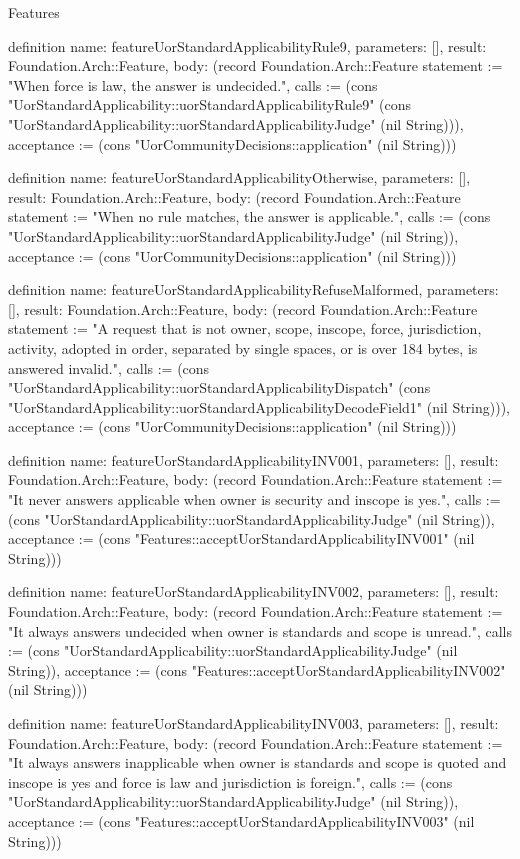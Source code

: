 \begin{lexlean}{Features}
\begin{semanticmodule}
definition{
  name: featureUorStandardApplicabilityRule9,
  parameters: [],
  result: Foundation.Arch::Feature,
  body: (record Foundation.Arch::Feature {statement := "When force is law, the answer is undecided.", calls := (cons "UorStandardApplicability::uorStandardApplicabilityRule9" (cons "UorStandardApplicability::uorStandardApplicabilityJudge" (nil String))), acceptance := (cons "UorCommunityDecisions::application" (nil String))})
}

definition{
  name: featureUorStandardApplicabilityOtherwise,
  parameters: [],
  result: Foundation.Arch::Feature,
  body: (record Foundation.Arch::Feature {statement := "When no rule matches, the answer is applicable.", calls := (cons "UorStandardApplicability::uorStandardApplicabilityJudge" (nil String)), acceptance := (cons "UorCommunityDecisions::application" (nil String))})
}

definition{
  name: featureUorStandardApplicabilityRefuseMalformed,
  parameters: [],
  result: Foundation.Arch::Feature,
  body: (record Foundation.Arch::Feature {statement := "A request that is not owner, scope, inscope, force, jurisdiction, activity, adopted in order, separated by single spaces, or is over 184 bytes, is answered invalid.", calls := (cons "UorStandardApplicability::uorStandardApplicabilityDispatch" (cons "UorStandardApplicability::uorStandardApplicabilityDecodeField1" (nil String))), acceptance := (cons "UorCommunityDecisions::application" (nil String))})
}

definition{
  name: featureUorStandardApplicabilityINV001,
  parameters: [],
  result: Foundation.Arch::Feature,
  body: (record Foundation.Arch::Feature {statement := "It never answers applicable when owner is security and inscope is yes.", calls := (cons "UorStandardApplicability::uorStandardApplicabilityJudge" (nil String)), acceptance := (cons "Features::acceptUorStandardApplicabilityINV001" (nil String))})
}

definition{
  name: featureUorStandardApplicabilityINV002,
  parameters: [],
  result: Foundation.Arch::Feature,
  body: (record Foundation.Arch::Feature {statement := "It always answers undecided when owner is standards and scope is unread.", calls := (cons "UorStandardApplicability::uorStandardApplicabilityJudge" (nil String)), acceptance := (cons "Features::acceptUorStandardApplicabilityINV002" (nil String))})
}

definition{
  name: featureUorStandardApplicabilityINV003,
  parameters: [],
  result: Foundation.Arch::Feature,
  body: (record Foundation.Arch::Feature {statement := "It always answers inapplicable when owner is standards and scope is quoted and inscope is yes and force is law and jurisdiction is foreign.", calls := (cons "UorStandardApplicability::uorStandardApplicabilityJudge" (nil String)), acceptance := (cons "Features::acceptUorStandardApplicabilityINV003" (nil String))})
}


\end{semanticmodule}
\end{lexlean}
